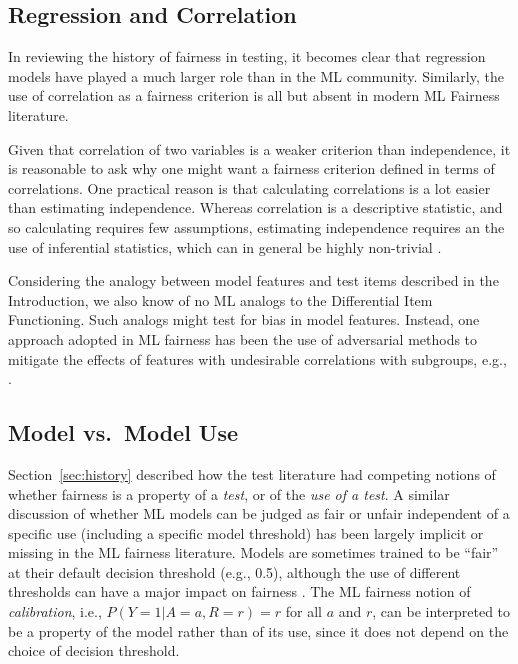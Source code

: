 \documentclass[sigconf,letterpaper,9pt]{acmart}
\begin{document}
\subsection{Regression and Correlation}

In reviewing the history of fairness in testing, it becomes clear that regression models have played a much larger role than in the ML community. Similarly, the use of correlation as a fairness criterion is all but absent in modern ML
Fairness literature.

Given that correlation of two variables is a weaker criterion than independence,
it is reasonable to ask why one might want a fairness criterion defined in terms
of correlations. One practical reason is that calculating correlations is a lot
easier than estimating independence. Whereas correlation is a descriptive statistic,
and so calculating requires few assumptions, estimating independence requires an
the use of inferential statistics, which can in general be highly non-trivial
\cite{shah2018hardness}. 


Considering the analogy between model features and test items described
in the Introduction, we also know of no ML analogs to the Differential Item Functioning. Such analogs
might test for bias in model features. Instead, one approach adopted in 
ML fairness has been the use of adversarial methods to mitigate the effects
of features with undesirable correlations with subgroups, e.g., \cite{beutel2017,ZhangEtAl2018}.


\subsection{Model vs.~Model Use}

Section~\ref{sec:history} described how the test literature had competing
notions of whether fairness is a property of a {\em test}, or of the
{\em use of a test}. 
A similar discussion of whether ML models can be judged as fair
or unfair independent of a specific use (including a specific
model threshold) has been largely implicit or missing in
the ML fairness literature. Models are sometimes trained
to be ``fair'' at their default decision threshold (e.g., 0.5), although
the use of different thresholds can have a major impact on fairness
\cite{Hardtetal2016equality}. The ML fairness notion of {\em calibration}, i.e., $P(Y=1 | A=a, R=r)=r$ for all $a$ and $r$,
can be interpreted to be a property of the model rather than of its use,
since it does not depend on 
the choice of decision threshold. 
\end{document}
